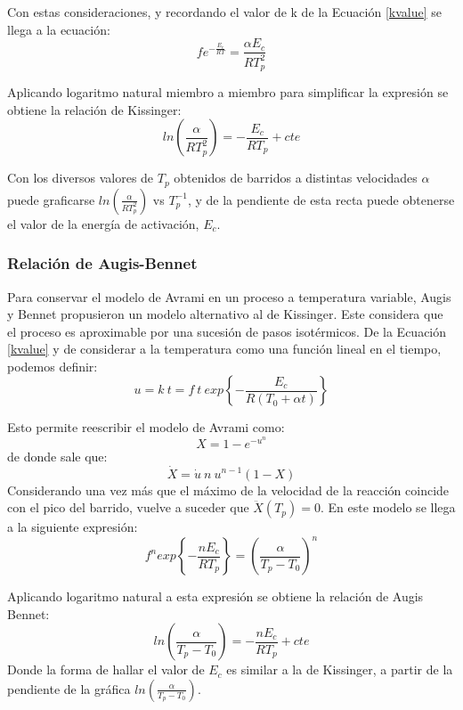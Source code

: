 \documentclass[12pt]{article}
\theoremstyle{definition}
\theoremstyle{remark}
\begin{document}
Con estas consideraciones, y recordando el valor de k de la Ecuación \ref{kvalue} se llega a la ecuación:
\begin{equation}
	fe^{-\frac{E_c}{RT}} = \frac{\alpha E_c}{R T_p^2}
\end{equation}

Aplicando logaritmo natural miembro a miembro para simplificar la expresión se obtiene la relación de Kissinger:
\begin{equation}
	ln(\frac{\alpha}{R T_p^2}) = -\frac{E_c}{RT_p} + cte
\end{equation}

Con los diversos valores de $T_p$ obtenidos de barridos a distintas velocidades $\alpha$ puede graficarse $ln(\frac{\alpha}{R T_p^2})$ vs $T_p^{-1}$, y de la pendiente de esta recta puede obtenerse el valor de la energía de activación, $E_c$.

\subsubsection{Relación de Augis-Bennet}
Para conservar el modelo de Avrami en un proceso a temperatura variable, Augis y Bennet propusieron un modelo alternativo al de Kissinger. Este considera que el proceso es aproximable por una sucesión de pasos isotérmicos.
De la Ecuación \ref{kvalue} y de considerar a la temperatura como una función lineal en el tiempo, podemos definir:
\begin{equation}
	u = k\: t = f\: t\: exp \left\lbrace -\frac{E_c}{R(T_0 + \alpha t)} \right\rbrace
\end{equation}

Esto permite reescribir el modelo de Avrami como:
\begin{equation}
	X = 1-e^{-u^{n}}
\end{equation}
de donde sale que:
\begin{equation}
	\dot{X} = \dot{u}\: n\: u^{n-1}(1-X)
\end{equation}
Considerando una vez más que el máximo de la velocidad de la reacción coincide con el pico del barrido, vuelve a suceder que $\ddot{X}(T_p) = 0$. En este modelo se llega a la siguiente expresión:
\begin{equation}
	f^n exp \left\lbrace -\frac{n E_c}{RT_p} \right\rbrace = (\frac{\alpha}{T_p - T_0})^n
\end{equation}

Aplicando logaritmo natural a esta expresión se obtiene la relación de Augis Bennet:
\begin{equation}
	ln(\frac{\alpha}{T_p - T_0}) = -\frac{n E_c}{RT_p} + cte
\end{equation}
Donde la forma de hallar el valor de $E_c$ es similar a la de Kissinger, a partir de la pendiente de la gráfica $ln(\frac{\alpha}{T_p - T_0})$.
\end{document}
